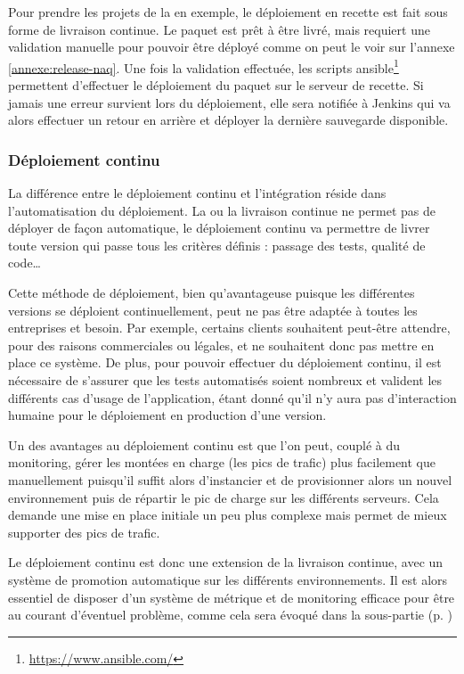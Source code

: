 Pour prendre les projets de la \naq{} en exemple, le déploiement en recette est fait sous forme de livraison continue. Le paquet est prêt à être livré, mais requiert une validation manuelle pour pouvoir être déployé comme on peut le voir sur l'annexe \ref{annexe:release-naq}. Une fois la validation effectuée, les scripts ansible\footnote{\url{https://www.ansible.com/}} permettent d'effectuer le déploiement du paquet sur le serveur de recette. Si jamais une erreur survient lors du déploiement, elle sera notifiée à Jenkins qui va alors effectuer un retour en arrière et déployer la dernière sauvegarde disponible.

\subsubsection{Déploiement continu}

La différence entre le déploiement continu et l'intégration réside dans l'automatisation du déploiement. La ou la livraison continue ne permet pas de déployer de façon automatique, le déploiement continu va permettre de livrer toute version qui passe tous les critères définis : passage des tests, qualité de code\ldots

Cette méthode de déploiement, bien qu'avantageuse puisque les différentes versions se déploient continuellement, peut ne pas être adaptée à toutes les entreprises et besoin. Par exemple, certains clients souhaitent peut-être attendre, pour des raisons commerciales ou légales, et ne souhaitent donc pas mettre en place ce système. De plus, pour pouvoir effectuer du déploiement continu, il est nécessaire de s'assurer que les tests automatisés soient nombreux et valident les différents cas d'usage de l'application, étant donné qu'il n'y aura pas d'interaction humaine pour le déploiement en production d'une version.

Un des avantages au déploiement continu est que l'on peut, couplé à du monitoring, gérer les montées en charge (les pics de trafic) plus facilement que manuellement puisqu'il suffit alors d'instancier et de provisionner alors un nouvel environnement puis de répartir le pic de charge sur les différents serveurs. Cela demande une mise en place initiale un peu plus complexe mais permet de mieux supporter des pics de trafic.

Le déploiement continu est donc une extension de la livraison continue, avec un système de promotion automatique sur les différents environnements. Il est alors essentiel de disposer d'un système de métrique et de monitoring efficace pour être au courant d'éventuel problème, comme cela sera évoqué dans la sous-partie  (p. \pageref{paragraph:monitoring})

